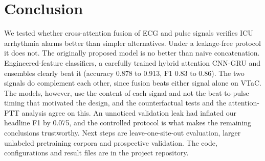 \documentclass[conference]{IEEEtran}
\begin{document}
\section{Conclusion}\label{sec:conclusion}
We tested whether cross-attention fusion of ECG and pulse signals verifies ICU arrhythmia alarms better than simpler alternatives. Under a leakage-free protocol it does not. The originally proposed model is no better than naive concatenation. Engineered-feature classifiers, a carefully trained hybrid attention CNN-GRU and ensembles clearly beat it (accuracy 0.878 to 0.913, F1 0.83 to 0.86). The two signals do complement each other, since fusion beats either signal alone on VTaC. The models, however, use the content of each signal and not the beat-to-pulse timing that motivated the design, and the counterfactual tests and the attention-PTT analysis agree on this. An unnoticed validation leak had inflated our headline F1 by 0.075, and the controlled protocol is what makes the remaining conclusions trustworthy. Next steps are leave-one-site-out evaluation, larger unlabeled pretraining corpora and prospective validation. The code, configurations and result files are in the project repository.



\end{document}
